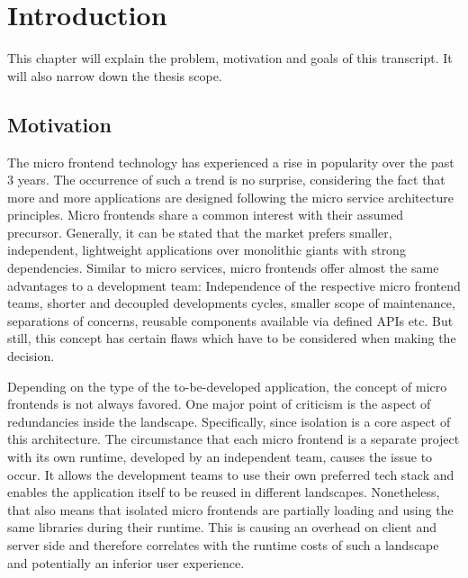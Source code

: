 \chapter{Introduction} %
\label{Chapter1}


This chapter will explain the problem, motivation and goals of this transcript. 
It will also narrow down the thesis scope.

\section{Motivation}

The micro frontend technology has experienced a rise in popularity over the past 3 years. The occurrence of such a trend is no surprise, considering the fact that more and more applications are designed following the micro service architecture principles.\cite{google_micro_frontend_trends} 
Micro frontends share a common interest with their assumed precursor. Generally, it can be stated that the market prefers smaller, independent, lightweight applications over monolithic giants with strong dependencies. Similar to micro services, micro frontends offer almost the same advantages to a development team: Independence of the respective micro frontend teams, shorter and decoupled developments cycles, smaller scope of maintenance, separations of concerns, reusable components available via defined APIs etc.\cite{advantages_of_mfes} But still, this concept has certain flaws which have to be considered when making the decision.\cite{Yang_2019}

Depending on the type of the to-be-developed application, the concept of micro frontends is not always favored. One major point of criticism is the aspect of redundancies inside the landscape. Specifically, since isolation is a core aspect of this architecture. The circumstance that each micro frontend is a separate project with its own runtime, developed by an independent team, causes the issue to occur. It allows the development teams to use their own preferred tech stack and enables the application itself to be reused in different landscapes. Nonetheless, that also means that isolated micro frontends are partially loading and using the same libraries during their runtime. This is causing an overhead on client and server side and therefore correlates with the runtime costs of such a landscape and potentially an inferior user experience.\cite{motivation_benefits_adopting_MFs}\cite{micro_frontends_in_general}

